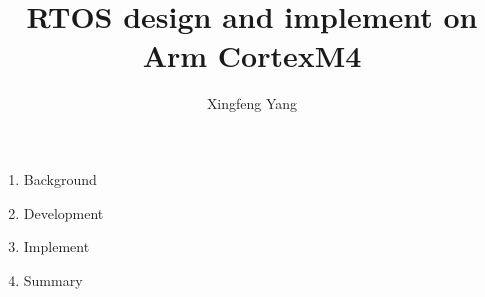 \documentclass{beamer}
\title{RTOS design and implement on Arm CortexM4 }
\author{Xingfeng Yang}
\begin{document}
	\begin{frame}
		\titlepage
	\end{frame}

	\begin{frame}
		\begin{enumerate}
		\item Background 
		\item Development
		\item Implement
		\item Summary
		\end{enumerate}
	\end{frame}
\end{document}
